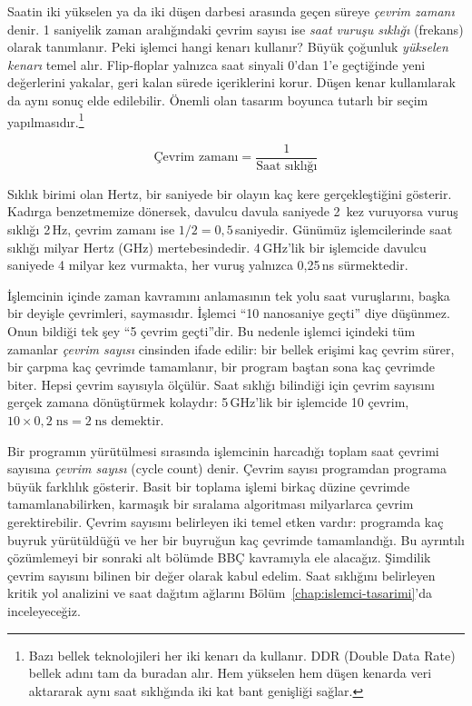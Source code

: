 Saatin iki yükselen ya da iki düşen darbesi arasında geçen süreye \emph{çevrim zamanı} denir. 1 saniyelik zaman aralığındaki çevrim sayısı ise \emph{saat vuruşu sıklığı} (frekans) olarak tanımlanır. Peki işlemci hangi kenarı kullanır? Büyük çoğunluk \emph{yükselen kenarı} temel alır. Flip-floplar yalnızca saat sinyali 0'dan 1'e geçtiğinde yeni değerlerini yakalar, geri kalan sürede içeriklerini korur. Düşen kenar kullanılarak da aynı sonuç elde edilebilir. Önemli olan tasarım boyunca tutarlı bir seçim yapılmasıdır.\footnote{Bazı bellek teknolojileri her iki kenarı da kullanır. DDR (Double Data Rate) bellek adını tam da buradan alır. Hem yükselen hem düşen kenarda veri aktararak aynı saat sıklığında iki kat bant genişliği sağlar.}

\begin{equation}
\text{Çevrim zamanı} = \frac{1}{\text{Saat sıklığı}}
\label{eq:cevrim-zamani}
\end{equation}

Sıklık birimi olan Hertz, bir saniyede bir olayın kaç kere gerçekleştiğini gösterir. Kadırga benzetmemize dönersek, davulcu davula saniyede 2~kez vuruyorsa vuruş sıklığı 2\,Hz, çevrim zamanı ise $1/2 = 0{,}5$\,saniyedir. Günümüz işlemcilerinde saat sıklığı milyar Hertz (GHz) mertebesindedir. 4\,GHz'lik bir işlemcide davulcu saniyede 4 milyar kez vurmakta, her vuruş yalnızca 0,25\,ns sürmektedir.

İşlemcinin içinde zaman kavramını anlamasının tek yolu saat vuruşlarını, başka bir deyişle çevrimleri, saymasıdır. İşlemci ``10 nanosaniye geçti'' diye düşünmez. Onun bildiği tek şey ``5 çevrim geçti''dir. Bu nedenle işlemci içindeki tüm zamanlar \emph{çevrim sayısı} cinsinden ifade edilir: bir bellek erişimi kaç çevrim sürer, bir çarpma kaç çevrimde tamamlanır, bir program baştan sona kaç çevrimde biter. Hepsi çevrim sayısıyla ölçülür. Saat sıklığı bilindiği için çevrim sayısını gerçek zamana dönüştürmek kolaydır: 5\,GHz'lik bir işlemcide 10 çevrim, $10 \times 0{,}2\;\text{ns} = 2\;\text{ns}$ demektir.

Bir programın yürütülmesi sırasında işlemcinin harcadığı toplam saat çevrimi sayısına \emph{çevrim sayısı} (cycle count) denir. Çevrim sayısı programdan programa büyük farklılık gösterir. Basit bir toplama işlemi birkaç düzine çevrimde tamamlanabilirken, karmaşık bir sıralama algoritması milyarlarca çevrim gerektirebilir. Çevrim sayısını belirleyen iki temel etken vardır: programda kaç buyruk yürütüldüğü ve her bir buyruğun kaç çevrimde tamamlandığı. Bu ayrıntılı çözümlemeyi bir sonraki alt bölümde BBÇ kavramıyla ele alacağız. Şimdilik çevrim sayısını bilinen bir değer olarak kabul edelim. Saat sıklığını belirleyen kritik yol analizini ve saat dağıtım ağlarını Bölüm~\ref{chap:islemci-tasarimi}'da inceleyeceğiz.

